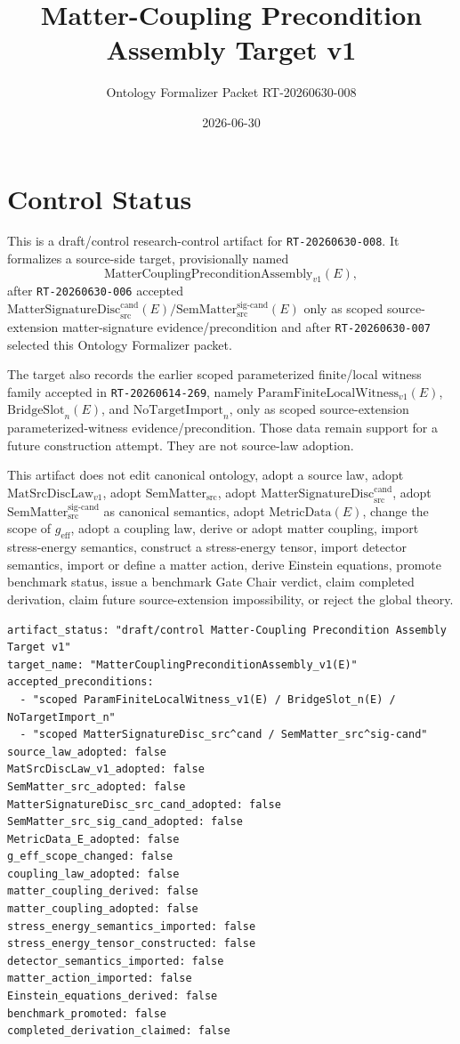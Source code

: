 \documentclass[11pt]{article}
\title{Matter-Coupling Precondition Assembly Target v1}
\author{Ontology Formalizer Packet RT-20260630-008}
\date{2026-06-30}
\newcommand{\MetricData}{\mathrm{MetricData}}
\newcommand{\geff}{g_{\mathrm{eff}}}
\newcommand{\MatSrcDiscLaw}{\mathrm{MatSrcDiscLaw}_{v1}}
\newcommand{\SemMatterSrc}{\mathrm{SemMatter}_{\mathrm{src}}}
\newcommand{\SemMatterSig}{\mathrm{SemMatter}_{\mathrm{src}}^{\mathrm{sig\text{-}cand}}}
\newcommand{\MatSigDisc}{\mathrm{MatterSignatureDisc}_{\mathrm{src}}^{\mathrm{cand}}}
\newcommand{\ParamWitness}{\mathrm{ParamFiniteLocalWitness}_{v1}}
\newcommand{\BridgeSlot}{\mathrm{BridgeSlot}}
\newcommand{\NoTargetImport}{\mathrm{NoTargetImport}}
\newcommand{\MCPA}{\mathrm{MatterCouplingPreconditionAssembly}_{v1}}
\begin{document}
\maketitle

\section{Control Status}

This is a draft/control research-control artifact for
\texttt{RT-20260630-008}. It formalizes a source-side target,
provisionally named
\[
  \MCPA(E),
\]
after \texttt{RT-20260630-006} accepted
\(\MatSigDisc(E) / \SemMatterSig(E)\) only as scoped source-extension
matter-signature evidence/precondition and after \texttt{RT-20260630-007}
selected this Ontology Formalizer packet.

The target also records the earlier scoped parameterized finite/local witness
family accepted in \texttt{RT-20260614-269}, namely
\(\ParamWitness(E)\), \(\BridgeSlot_n(E)\), and
\(\NoTargetImport_n\), only as scoped source-extension
parameterized-witness evidence/precondition. Those data remain support for a
future construction attempt. They are not source-law adoption.

This artifact does not edit canonical ontology, adopt a source law, adopt
\(\MatSrcDiscLaw\), adopt \(\SemMatterSrc\), adopt \(\MatSigDisc\), adopt
\(\SemMatterSig\) as canonical semantics, adopt \(\MetricData(E)\), change
the scope of \(\geff\), adopt a coupling law, derive or adopt matter
coupling, import stress-energy semantics, construct a stress-energy tensor,
import detector semantics, import or define a matter action, derive Einstein
equations, promote benchmark status, issue a benchmark Gate Chair verdict,
claim completed derivation, claim future source-extension impossibility, or
reject the global theory.

\begin{verbatim}
artifact_status: "draft/control Matter-Coupling Precondition Assembly Target v1"
target_name: "MatterCouplingPreconditionAssembly_v1(E)"
accepted_preconditions:
  - "scoped ParamFiniteLocalWitness_v1(E) / BridgeSlot_n(E) / NoTargetImport_n"
  - "scoped MatterSignatureDisc_src^cand / SemMatter_src^sig-cand"
source_law_adopted: false
MatSrcDiscLaw_v1_adopted: false
SemMatter_src_adopted: false
MatterSignatureDisc_src_cand_adopted: false
SemMatter_src_sig_cand_adopted: false
MetricData_E_adopted: false
g_eff_scope_changed: false
coupling_law_adopted: false
matter_coupling_derived: false
matter_coupling_adopted: false
stress_energy_semantics_imported: false
stress_energy_tensor_constructed: false
detector_semantics_imported: false
matter_action_imported: false
Einstein_equations_derived: false
benchmark_promoted: false
completed_derivation_claimed: false
\end{verbatim}
\end{document}
